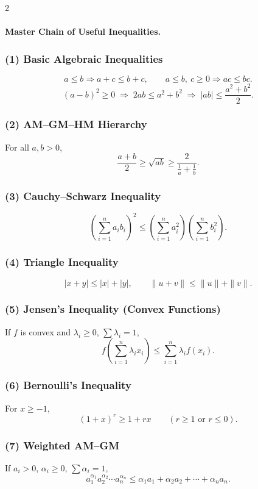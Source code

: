 \documentclass[8pt]{extarticle}
\theoremstyle{definition}
\begin{document}
\begin{multicols*}{2}
\paragraph{Master Chain of Useful Inequalities.}

\subsubsection*{(1) Basic Algebraic Inequalities}
\[
a \le b \Rightarrow a+c \le b+c,
\qquad
a \le b,\ c \ge 0 \Rightarrow ac \le bc.
\]
\[
(a-b)^2 \ge 0
\;\Rightarrow\;
2ab \le a^2 + b^2
\;\Rightarrow\;
|ab| \le \frac{a^2 + b^2}{2}.
\]

\subsubsection*{(2) AM--GM--HM Hierarchy}
For all \(a,b>0\),
\[
\frac{a+b}{2} \ge \sqrt{ab} \ge \frac{2}{\tfrac{1}{a}+\tfrac{1}{b}}.
\]

\subsubsection*{(3) Cauchy--Schwarz Inequality}
\[
\left(\sum_{i=1}^n a_i b_i\right)^2
\le
\left(\sum_{i=1}^n a_i^2\right)
\left(\sum_{i=1}^n b_i^2\right).
\]

\subsubsection*{(4) Triangle Inequality}
\[
|x+y|\le |x|+|y|,
\qquad
\|u+v\| \le \|u\| + \|v\|.
\]

\subsubsection*{(5) Jensen's Inequality (Convex Functions)}
If \(f\) is convex and \(\lambda_i \ge 0\), \(\sum \lambda_i = 1\),
\[
f\!\left(\sum_{i=1}^n \lambda_i x_i\right)
\le
\sum_{i=1}^n \lambda_i f(x_i).
\]

\subsubsection*{(6) Bernoulli's Inequality}
For \(x \ge -1\),
\[
(1+x)^r \ge 1 + rx
\qquad (r \ge 1 \text{ or } r \le 0).
\]

\subsubsection*{(7) Weighted AM--GM}
If \(a_i > 0\), \(\alpha_i \ge 0\), \(\sum\alpha_i = 1\),
\[
a_1^{\alpha_1} a_2^{\alpha_2}\cdots a_n^{\alpha_n}
\le
\alpha_1 a_1 + \alpha_2 a_2 + \cdots + \alpha_n a_n.
\]


\end{multicols*}
\end{document}
